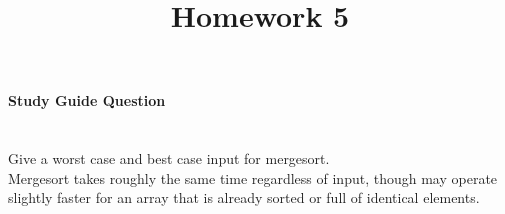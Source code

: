 \documentclass{article}
\begin{document}
\title{Homework 5}
\date{}
\maketitle

\paragraph{\Large Study Guide Question}\mbox{}\\
Give a worst case and best case input for mergesort.\\

Mergesort takes roughly the same time regardless of input, though may operate slightly faster for an array that is already sorted or full of identical elements.
\end{document}
